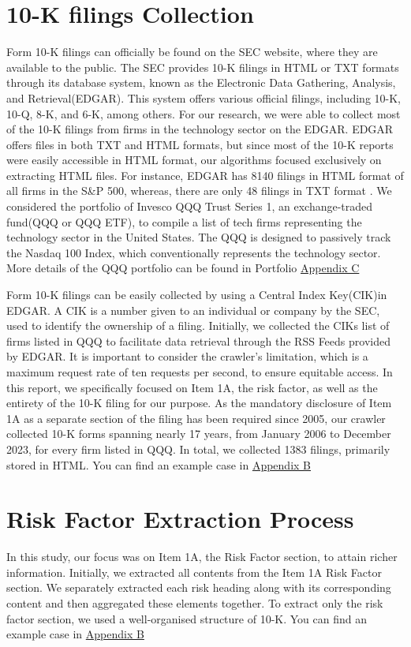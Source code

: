 \documentclass[logo,bsc,singlespacing,parskip]{infthesis}
\begin{document}
\section{10-K filings Collection}
Form 10-K filings can officially be found on the SEC website, where they are available to the public. The SEC provides 10-K filings in HTML or TXT formats through its database system, known as the Electronic Data Gathering, Analysis, and Retrieval(EDGAR). This system offers various official filings, including 10-K, 10-Q, 8-K, and 6-K, among others. For our research, we were able to collect most of the 10-K filings from firms in the technology sector on the EDGAR. EDGAR offers files in both TXT and HTML formats, but since most of the 10-K reports were easily accessible in HTML format, our algorithms focused exclusively on extracting HTML files. For instance, EDGAR has 8140 filings in HTML format of all firms in the S\&P 500, whereas, there are only 48 filings in TXT format \cite{Sha2023}. We considered the portfolio of Invesco QQQ Trust Series 1, an exchange-traded fund(QQQ or QQQ ETF), to compile a list of tech firms representing the technology sector in the United States. The QQQ is designed to passively track the Nasdaq 100 Index, which conventionally represents the technology sector. More details of the QQQ portfolio can be found in Portfolio \hyperref[portfolio]{Appendix C} 

Form 10-K filings can be easily collected by using a Central Index Key(CIK)in EDGAR. A CIK is a number given to an individual or company by the SEC, used to identify the ownership of a filing. Initially, we collected the CIKs list of firms listed in QQQ to facilitate data retrieval through the RSS Feeds provided by EDGAR. It is important to consider the crawler’s limitation, which is a maximum request rate of ten requests per second, to ensure equitable access. In this report, we specifically focused on Item 1A, the risk factor, as well as the entirety of the 10-K filing for our purpose. As the mandatory disclosure of Item 1A as a separate section of the filing has been required since 2005, our crawler collected 10-K forms spanning nearly 17 years, from January 2006 to December 2023, for every firm listed in QQQ. In total, we collected 1383 filings, primarily stored in HTML. You can find an example case in \hyperref[appendix_nvidia_10-k]{Appendix B}


\section{Risk Factor Extraction Process}
In this study, our focus was on Item 1A, the Risk Factor section, to attain richer information. Initially, we extracted all contents from the Item 1A Risk Factor section. We separately extracted each risk heading along with its corresponding content and then aggregated these elements together. To extract only the risk factor section, we used a well-organised structure of 10-K. You can find an example case in \hyperref[appendix_nvidia_risk]{Appendix B}
\end{document}
